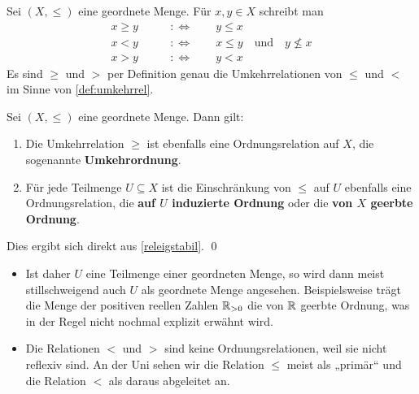 \begin{nota}
    Sei $(X,\le)$ eine geordnete Menge. Für $x,y\in X$ schreibt man
    \begin{align*}
        x \ge y \qquad &:\Leftrightarrow\qquad y \le x \\
        x < y \qquad &:\Leftrightarrow\qquad x\le y\quad \text{und}\quad y \not \le x \\
        x > y \qquad &:\Leftrightarrow\qquad y < x
    \end{align*}
    Es sind $\ge$ und $>$ per Definition genau die Umkehrrelationen von $\le$ und $<$ im Sinne von \cref{def:umkehrrel}.
\end{nota}


\begin{satz}[*]
    Sei $(X,\le)$ eine geordnete Menge. Dann gilt:
    \begin{enumerate}
        \item Die Umkehrrelation $\ge$ ist ebenfalls eine Ordnungsrelation auf $X$, die sogenannte \textbf{Umkehrordnung}.
        \item Für jede Teilmenge $U\subseteq X$ ist die Einschränkung von $\le$ auf $U$ ebenfalls eine Ordnungsrelation, die \textbf{auf $U$ induzierte Ordnung} oder die \textbf{von $X$ geerbte Ordnung}.
    \end{enumerate}
\end{satz}


\begin{bew}
    Dies ergibt sich direkt aus \cref{releigstabil}. \qed
\end{bew}


\begin{bem} \quad
    \begin{itemize}
        \item Ist daher $U$ eine Teilmenge einer geordneten Menge, so wird dann meist stillschweigend auch $U$ als geordnete Menge angesehen. Beispielsweise trägt die Menge der positiven reellen Zahlen $\mathbb R_{>0}$ die von $\mathbb R$ geerbte Ordnung, was in der Regel nicht nochmal explizit erwähnt wird.
        \item Die Relationen $<$ und $>$ sind keine Ordnungsrelationen, weil sie nicht reflexiv sind. An der Uni sehen wir die Relation $\le$ meist als „primär“ und die Relation $<$ als daraus abgeleitet an.
    \end{itemize}
\end{bem}


